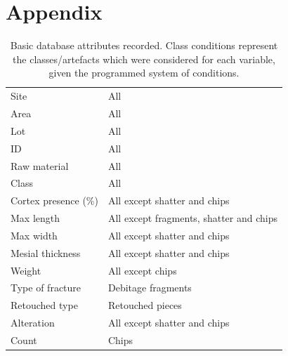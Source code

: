 \documentclass[12pt,twoside]{reedthesis}
\begin{document}
\hypertarget{appendix}{%
\chapter{Appendix}\label{appendix}}
\begin{table}

\caption{\label{tab:unnamed-chunk-52}Basic database attributes recorded. Class conditions represent the classes/artefacts which were considered for each variable, given the programmed system of conditions.}
\centering
\begin{tabular}[t]{>{\raggedright\arraybackslash}p{5cm}>{\raggedright\arraybackslash}p{5cm}}
\toprule
\multicolumn{1}{>{\centering\arraybackslash}p{5cm}}{\textbf{Recorded variables}} & \multicolumn{1}{>{\centering\arraybackslash}p{5cm}}{\textbf{Class conditions}}\\
\midrule
Site & All\\
Area & All\\
Lot & All\\
ID & All\\
Raw material & All\\
\addlinespace
Class & All\\
Cortex presence (\%) & All except shatter and chips\\
Max length & All except fragments, shatter and chips\\
Max width & All except shatter and chips\\
Mesial thickness & All except shatter and chips\\
\addlinespace
Weight & All except chips\\
Type of fracture & Debitage fragments\\
Retouched type & Retouched pieces\\
Alteration & All except shatter and chips\\
Count & Chips\\
\bottomrule
\end{tabular}
\end{table}
\end{document}
